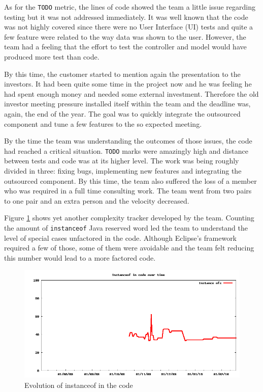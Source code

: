 \documentclass[lnbip]{svmultln}
\begin{document}
As for the \texttt{TODO} metric, the lines of code showed the team a
little issue regarding testing but it was not addressed
immediately. It was well known that the code was not highly covered
since there were no User Interface (UI) tests and quite a few feature
were related to the way data was shown to the user. However, the team
had a feeling that the effort to test the controller and model would
have produced more test than code.

By this time, the customer started to mention again the presentation
to the investors. It had been quite some time in the project now and
he was feeling he had spent enough money and needed some external
investment. Therefore the old investor meeting pressure installed
itself within the team and the deadline was, again, the end of the
year. The goal was to quickly integrate the outsourced component and
tune a few features to the so expected meeting.

By the time the team was understanding the outcomes of those issues,
the code had reached a critical situation. \texttt{TODO} marks were
amazingly high and distance between tests and code was at its higher
level. The work was being roughly divided in three: fixing bugs,
implementing new features and integrating the outsourced component. By
this time, the team also suffered the loss of a member who was
required in a full time consulting work. The team went from two pairs
to one pair and an extra person and the velocity decreased.

Figure \ref{fig:InstanceOfs} shows yet another complexity tracker
developed by the team. Counting the amount of \texttt{instanceof} Java
reserved word led the team to understand the level of special cases
unfactored in the code. Although Eclipse's framework required a few of
those, some of them were avoidable and the team felt reducing this
number would lead to a more factored code.

\begin{figure}[hbt]
  \centerline{
    \includegraphics[width=120mm]{InstanceOfs.png}
  }
  \caption{Evolution of instanceof in the code }
  \label{fig:InstanceOfs}
\end{figure}
\end{document}
